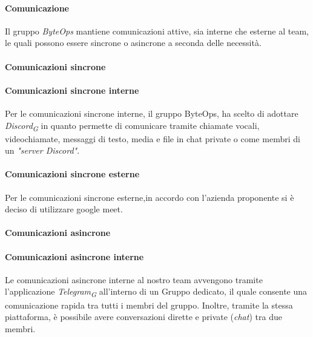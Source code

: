 \paragraph{Comunicazione}
Il gruppo \textit{ByteOps} mantiene comunicazioni attive, sia interne che esterne al team, le quali possono essere sincrone o asincrone a seconda delle necessità.
\paragraph{Comunicazioni sincrone}
\paragraph*{Comunicazioni sincrone interne}
Per le comunicazioni sincrone interne, il gruppo ByteOps, ha scelto di adottare \textit{Discord}\textsubscript{\textit{G}} in quanto permette di comunicare tramite chiamate vocali, videochiamate, messaggi di testo, media e file in chat private o come membri di un \textit{"server Discord"}.
\paragraph*{Comunicazioni sincrone esterne}
Per le comunicazioni sincrone esterne,in accordo con l'azienda proponente si è deciso di utilizzare google meet.
\paragraph{Comunicazioni asincrone}
\paragraph*{Comunicazioni asincrone interne}
Le comunicazioni asincrone interne al nostro team avvengono tramite l'applicazione \textit{Telegram}\textsubscript{\textit{G}} all'interno di un Gruppo dedicato, il quale consente una comunicazione rapida tra tutti i membri del gruppo. Inoltre, tramite la stessa piattaforma, è possibile avere conversazioni dirette e private (\textit{chat}) tra due membri.
